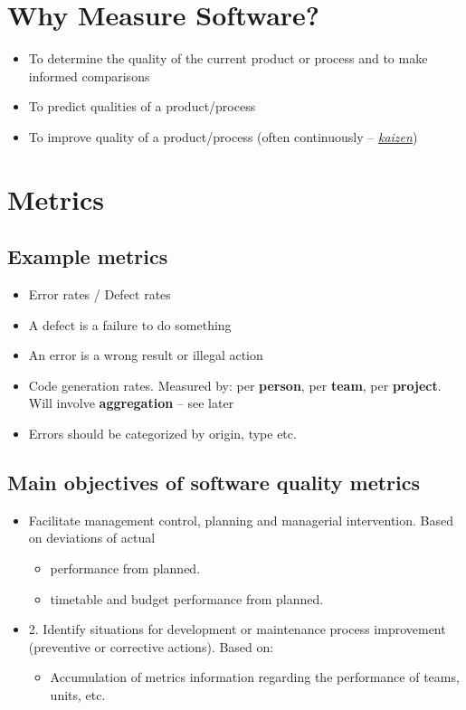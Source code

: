 \documentclass{article}
\newcommand{\worddef}[1]{\hyperref[sec:reference]{\textit{#1}}}
\begin{document}
\tableofcontents

\newpage

\section{Why Measure Software?}

\begin{itemize}
  \item To determine the quality of the current product or process and to make informed comparisons
  \item To predict qualities of a product/process
  \item To improve quality of a product/process (often continuously – \worddef{kaizen})
\end{itemize}

\section{Metrics}

\subsection{Example metrics}
\begin{itemize}
  \item Error rates / Defect rates 
  \item A defect is a failure to do something 
  \item An error is a wrong result or illegal action 
  \item Code generation rates. Measured by: per \textbf{person}, per \textbf{team}, per \textbf{project}. Will involve \textbf{aggregation} – see later
  \item Errors should be categorized by origin, type etc.
\end{itemize}

\subsection{Main objectives of software quality metrics}

\begin{itemize}
  \item Facilitate management control, planning and managerial intervention. Based on deviations of actual 
  \begin{itemize}
    \item performance from planned.
    \item timetable and budget performance from planned. 
  \end{itemize}
  \item 2. Identify situations for development or maintenance process improvement (preventive or corrective actions). Based on:
  \begin{itemize}
    \item Accumulation of metrics information regarding the performance of teams, units, etc.
  \end{itemize}
\end{itemize}
\end{document}
